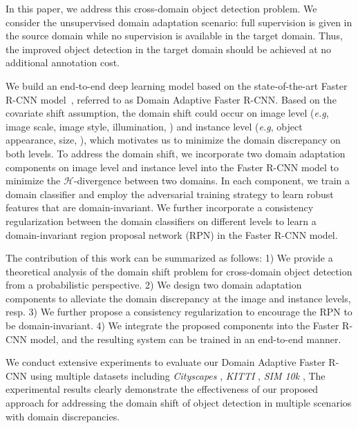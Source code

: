 \documentclass[10pt,twocolumn,letterpaper]{article}
\def\eg{\emph{e.g}}
\def\cH{\mathcal{H}}
\def\dim{\textit{SIM 10k} }
\def\cs{\textit{Cityscapes} }
\def\kitti{\textit{KITTI} }
\begin{document}
In this paper, we address this cross-domain object detection problem. We consider the unsupervised domain adaptation scenario: full supervision is given in the source domain while no supervision is available in the target domain. Thus, the improved object detection in the target domain should be achieved at no additional annotation cost. 

We build an end-to-end deep learning model based on the state-of-the-art Faster R-CNN model~\cite{ren2015faster}, referred to as Domain Adaptive Faster R-CNN. 
Based on the covariate shift assumption, the domain shift could occur on image level (\eg, image scale, image style, illumination, \etc) and instance level (\eg, object appearance, size, \etc), which motivates us to minimize the domain discrepancy on both levels. To address the domain shift, we incorporate two domain adaptation components on image level and instance level into the Faster R-CNN model to minimize the $\cH$-divergence between two domains. In each component, we train a domain classifier and employ the adversarial training strategy to learn robust features that are domain-invariant. We further incorporate a consistency regularization between the domain classifiers on different levels to learn a domain-invariant region proposal network (RPN) in the Faster R-CNN model.

The contribution of this work can be summarized as follows: 1) We provide a theoretical analysis of the domain shift problem for cross-domain object detection from a probabilistic perspective. 2) We design two domain adaptation components to alleviate the domain discrepancy at the image and instance levels, resp. 3) We further propose a consistency regularization to encourage the RPN to be domain-invariant. 4) We integrate the proposed components into the Faster R-CNN model, and the resulting system can be trained in an end-to-end manner.

We conduct extensive experiments to evaluate our Domain Adaptive Faster R-CNN using multiple datasets including \cs\cite{cordts2016cityscapes}, \kitti\cite{geiger2013vision}, \dim\cite{johnson2017driving}, \etc The experimental results clearly demonstrate the effectiveness of our proposed approach for addressing the domain shift of object detection in multiple scenarios with domain discrepancies.
\end{document}
